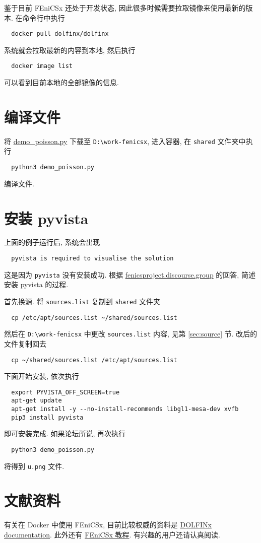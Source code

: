 \documentclass[fontset=founder]{ctexrep}
\begin{document}
鉴于目前 FEniCSx 还处于开发状态,
因此很多时候需要拉取镜像来使用最新的版本.
在命令行中执行
\begin{lstlisting}
  docker pull dolfinx/dolfinx
\end{lstlisting}
系统就会拉取最新的内容到本地,
然后执行
\begin{lstlisting}
  docker image list
\end{lstlisting}
可以看到目前本地的全部镜像的信息.

\section{编译文件}

将 \href{https://docs.fenicsproject.org/dolfinx/main/python/_downloads/756b4617c0f8921ed14fbd158af0c99c/demo_poisson.py}{demo\_poisson.py} 下载至 \texttt{D:\textbackslash work-fenicsx},
进入容器,
在 \texttt{shared} 文件夹中执行
\begin{lstlisting}
  python3 demo_poisson.py
\end{lstlisting}
编译文件.

\section{安装 pyvista}

上面的例子运行后,
系统会出现
\begin{lstlisting}
  pyvista is required to visualise the solution
\end{lstlisting}
这是因为 \texttt{pyvista} 没有安装成功.
根据 \href{https://fenicsproject.discourse.group/t/how-to-use-pyvista-in-docker-for-windows-10-user/6921}{fenicsproject.discourse.group} 的回答,
简述安装 pyvista 的过程.

首先换源.
将 \texttt{sources.list} 复制到 \texttt{shared} 文件夹
\begin{lstlisting}
  cp /etc/apt/sources.list ~/shared/sources.list
\end{lstlisting}
然后在 \texttt{D:\textbackslash work-fenicsx} 中更改 \texttt{sources.list} 内容,
见第 \ref{sec:source} 节.
改后的文件复制回去
\begin{lstlisting}
  cp ~/shared/sources.list /etc/apt/sources.list
\end{lstlisting}

下面开始安装,
依次执行
\begin{lstlisting}
  export PYVISTA_OFF_SCREEN=true
  apt-get update
  apt-get install -y --no-install-recommends libgl1-mesa-dev xvfb
  pip3 install pyvista
\end{lstlisting}
即可安装完成.
如果论坛所说,
再次执行
\begin{lstlisting}
  python3 demo_poisson.py
\end{lstlisting}
将得到 \texttt{u.png} 文件.

\section{文献资料}

有关在 Docker 中使用 FEniCSx,
目前比较权威的资料是  \href{https://docs.fenicsproject.org/dolfinx/main/python/index.html}{DOLFINx documentation}.
此外还有  \href{https://jorgensd.github.io/dolfinx-tutorial/index.html}{FEniCSx 教程}.
有兴趣的用户还请认真阅读.
\end{document}
